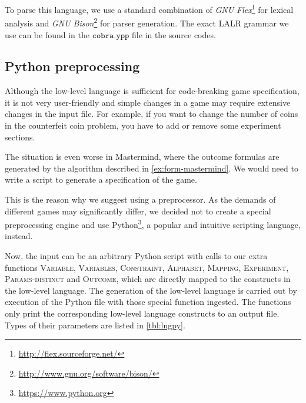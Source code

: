 To parse this language, we use a standard combination of
\emph{GNU Flex}\footnote{\url{http://flex.sourceforge.net/}} for lexical analysis and
\emph{GNU Bison}\footnote{\url{http://www.gnu.org/software/bison/}} for parser generation.
The exact LALR grammar we use can be found in the $\texttt{cobra.ypp}$ file
  in the source codes.

\subsection{Python preprocessing}

Although the low-level language is sufficient for code-breaking game specification,
  it is not very user-friendly and
  simple changes in a game may require extensive changes in the input file.
For example, if you want to change the number of coins in the counterfeit coin problem,
  you have to add or remove some experiment sections.

The situation is even worse in Mastermind, where the outcome formulas are
  generated by the algorithm described in \autoref{ex:form-mastermind}.
We would need to write a script to generate a specification of the game.

This is the reason why we suggest using a preprocessor.
As the demands of different games may significantly differ,
  we decided not to create a special preprocessing engine
  and use Python\footnote{\url{https://www.python.org}},
  a popular and intuitive scripting language, instead.

Now, the input can be an arbitrary Python script with calls to our extra functions
\textsc{Variable}, \textsc{Variables}, \textsc{Constraint}, \textsc{Alphabet},
\textsc{Mapping}, \textsc{Experiment}, \textsc{Params-distinct} and \textsc{Outcome},
which are directly mapped to the constructs in the low-level language.
The generation of the low-level language is carried out by execution of the Python file
  with those special function ingested.
The functions only print the corresponding low-level language constructs
  to an output file.
Types of their parameters are listed in \autoref{tbl:lngpy}.


